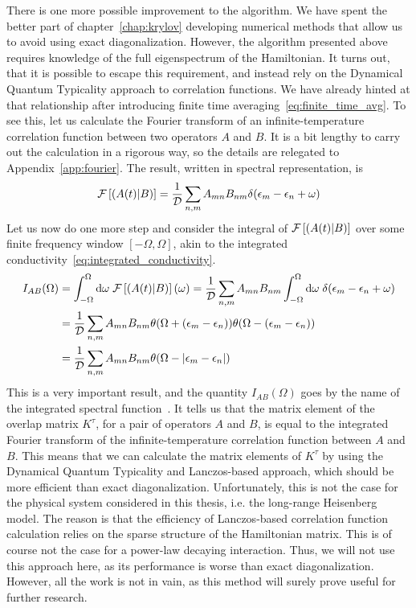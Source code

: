   There is one more possible improvement to the algorithm. We have spent the better part of chapter~\ref{chap:krylov}
developing numerical methods that allow us to avoid using exact diagonalization. However, the algorithm presented
above requires knowledge of the full eigenspectrum of the Hamiltonian. It turns out, that it is possible
to escape this requirement, and instead rely on the Dynamical Quantum Typicality approach to correlation functions.
We have already hinted at that relationship after introducing finite time averaging~\eqref{eq:finite_time_avg}.
To see this, let us calculate the Fourier transform of an infinite-temperature correlation function between
two operators \(A\) and \(B\). It is a bit lengthy to carry out the calculation in a rigorous way, so the
details are relegated to Appendix~\ref{app:fourier}. The result, written in spectral representation, is
\begin{equation}  
  \mathcal{F}\left[\left(A(t) \middle| B\right)\right] = \frac{1}{\mathcal{D}}\sum_{n,m} A_{mn} B_{nm} \delta(\epsilon_m-\epsilon_n+\omega)
  \label{eq:fourier_corr}
\end{equation}
Let us now do one more step and consider the integral of \(\mathcal{F}\left[\left(A(t) \middle| B\right)\right]\) over
some finite frequency window \([-\Omega, \Omega]\), akin to the integrated conductivity~\eqref{eq:integrated_conductivity}.
\begin{align}
    I_{AB}(\Omega) &= \int_{-\Omega}^{\Omega} \mathrm{d}\omega\; \mathcal{F}\left[\left(A(t) \middle| B\right)\right](\omega) =
    \frac{1}{\mathcal{D}}\sum_{n,m} A_{mn} B_{nm} \int_{-\Omega}^{\Omega} \mathrm{d}\omega \;
    \delta(\epsilon_m-\epsilon_n+\omega) \nonumber \\ &= \frac{1}{\mathcal{D}}\sum_{n,m} A_{mn} B_{nm}
    \theta(\Omega + (\epsilon_m-\epsilon_n))\theta(\Omega - (\epsilon_m-\epsilon_n)) \nonumber\\
    &= \frac{1}{\mathcal{D}}\sum_{n,m} A_{mn} B_{nm}\theta(\Omega - \abs{\epsilon_m-\epsilon_n})
    \label{eq:integrated_spectral}
\end{align}
This is a very important result, and the quantity \(I_{AB}(\Omega)\) goes by the name of
the integrated spectral function~\autocite{Vidmar2021}.
It tells us that the matrix element of the overlap matrix \(K^{\tau}\),
for a pair of operators \(A\) and \(B\), is equal to the integrated Fourier transform of the infinite-temperature
correlation function between \(A\) and \(B\). This means that we can calculate the matrix elements of \(K^{\tau}\)
by using the Dynamical Quantum Typicality and Lanczos-based approach, which should be more efficient than exact diagonalization.
Unfortunately, this is not the case for the  physical system considered in this thesis,
i.e. the long-range Heisenberg model. The reason is that the efficiency of Lanczos-based
correlation function calculation relies on the sparse structure of the Hamiltonian matrix.
This is of course not the case for a power-law decaying interaction. Thus, we will not use this approach
here, as its performance is worse than exact diagonalization. However, all the work is not in vain, as this method will surely prove useful
for further research.

